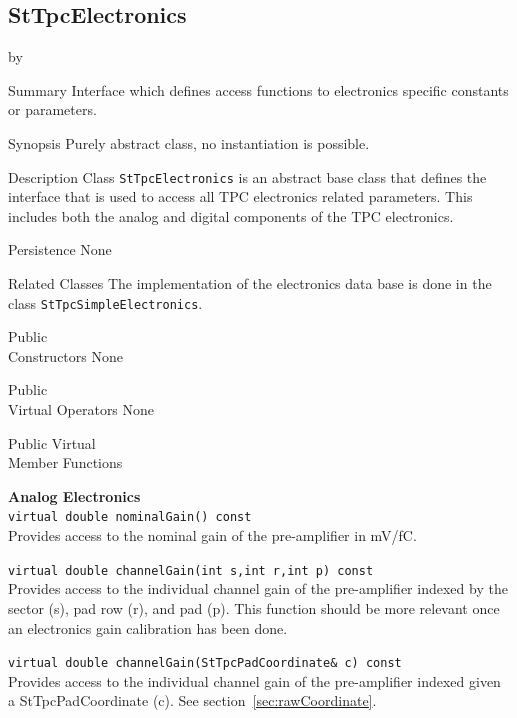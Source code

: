 \documentclass[twoside]{article}
\newcommand{\comp}[1]{\texttt{#1}}%
\newcommand{\entrylabel}[1]{\mbox{\textbf{{#1}}}\hfil}%
\newenvironment{entry}
{\begin{list}{}%
    {\renewcommand{\makelabel}{\entrylabel}%
     \setlength{\labelwidth}{90pt}%
     \setlength{\leftmargin}{\labelwidth}
     \advance\leftmargin by \labelsep%
      }%
    }%
  {\end{list}}
\newcommand{\Entrylabel}[1]%
{\raisebox{0pt}[1ex][0pt]{\makebox[\labelwidth][l]%
    {\parbox[t]{\labelwidth}{\hspace{0pt}\textbf{{#1}}}}}}
\newenvironment{Entry}%
{\renewcommand{\entrylabel}{\Entrylabel}\begin{entry}}%
  {\end{entry}}
\begin{document}
\subsection{StTpcElectronics} 
\label{sec:stTpcElectronics}
\begin{Entry}
\item[Summary]
  Interface which defines access functions to electronics specific
  constants or parameters.      

\item[Synopsis]
  Purely abstract class, no instantiation is  possible.
  
\item[Description]
Class \comp{StTpcElectronics} is an abstract base class that defines
the interface that is used to access all TPC electronics related 
parameters.  This includes both the analog and digital components of 
the TPC electronics.

\item[Persistence]
   None

\item[Related Classes]
The implementation of the electronics data base is done in
the class \comp{StTpcSimpleElectronics}.

\item[Public \\ Constructors]
   None

\item[Public \\ Virtual Operators]
   None

\item[Public Virtual \\ Member Functions]

  {\bf Analog Electronics\\} 
  \verb+virtual double nominalGain() const+\\
  Provides access to the nominal gain of the pre-amplifier in mV/fC.

  \verb+virtual double channelGain(int s,int r,int p) const+\\
  Provides access to the individual channel gain of the pre-amplifier
  indexed  by the sector (s), pad row (r), and pad (p).  This function
  should be more relevant once an electronics gain calibration has been
  done.

  \verb+virtual double channelGain(StTpcPadCoordinate& c) const+\\
  Provides access to the individual channel gain of the pre-amplifier  
  indexed  given a StTpcPadCoordinate (c).  
  See section~\ref{sec:rawCoordinate}.


\end{Entry}
\end{document}
